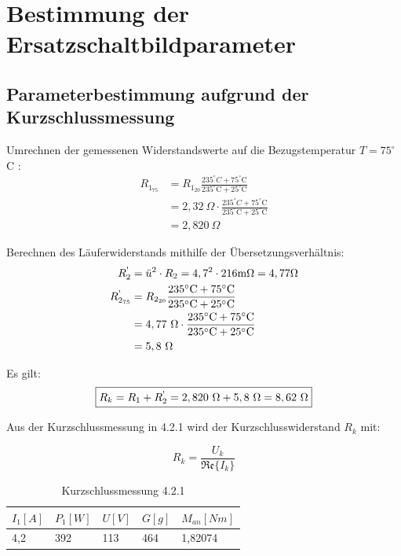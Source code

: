 \documentclass[conference]{IEEEtran}
\begin{document}
\section{Bestimmung der Ersatzschaltbildparameter}
\subsection{Parameterbestimmung aufgrund der Kurzschlussmessung}

Umrechnen der gemessenen Widerstandswerte auf die Bezugstemperatur $T=75^\circ$C :
\begin{align*}
    R_{1_{75}} & = R_{1_{20}}\frac{235^\circ\si{C}+75^\circ\text{C}}{235^\circ\text{C}+25^\circ\text{C}}         \\
               & = 2,32\ \Omega\cdot \frac{235^\circ\si{C}+75^\circ\text{C}}{235^\circ\text{C}+25^\circ\text{C}} \\
               & = 2,820\ \Omega
\end{align*}

Berechnen des Läuferwiderstands mithilfe der Übersetzungsverhältnis:
\begin{align*}
    R_2^\text{\textquotesingle}        & = \ddot{u}^2\cdot R_2 = 4,7^2 \cdot 216\si{m\Omega}   = 4,77 \Omega                             \\
    R_{2_{75}}^\text{\textquotesingle} & = R_{2_{20}}\frac{235^\circ\si{C}+75^\circ\text{C}}{235^\circ\text{C}+25^\circ\text{C}}         \\
                                       & = 4,77\ \Omega\cdot \frac{235^\circ\si{C}+75^\circ\text{C}}{235^\circ\text{C}+25^\circ\text{C}} \\
                                       & = 5,8\ \Omega
\end{align*}

Es gilt:
\begin{equation} \label{eq:Kurzschlusswiderstand_gemessen}
    \boxed{R_k = R_1 + R_2^\text{\textquotesingle} = 2,820\ \Omega + 5,8\ \Omega = 8,62\ \Omega}
\end{equation}

Aus der Kurzschlussmessung in 4.2.1 wird der Kurzschlusswiderstand $R_k$ mit:

\begin{equation}
    \boxed{R_k = \frac{U_k}{\mathfrak{Re}\{I_k\}}}
\end{equation}

\begin{table}[htbp]
    \begin{tabularx}{\columnwidth}{XXXXX}
        \toprule
        $I_1[A]$ & $P_1[W]$ & $U[V]$ & $G[g]$ & $M_{an}[Nm]$ \\
        \midrule
        4,2      & 392      & 113    & 464    & 1,82074      \\
        \bottomrule
    \end{tabularx}
    \caption{Kurzschlussmessung 4.2.1}
    \label{tab:Kurzschlussmessung}
\end{table}
\end{document}
